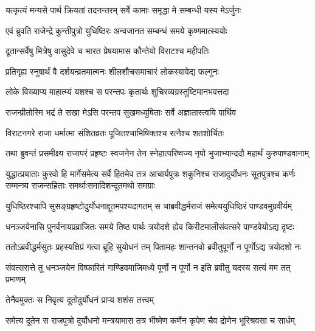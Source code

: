\twolineshloka
{यत्कृत्यं मन्यसे पार्थ क्रियतां तदनन्तरम्}
{सर्वे कामाः समृद्धा मे सम्बन्धी यस्य मेऽर्जुनः}



\twolineshloka
{एवं ब्रुवति राजेन्द्रे कुन्तीपुत्रो युधिष्ठिरः}
{अन्वजानत सम्बन्धं समये कृष्णमात्स्ययोः}


\twolineshloka
{दूतान्सर्वेषु मित्रेषु वासुदेवे च भारत}
{प्रेषयामास कौन्तेयो विराटश्च महीपतिः}



\twolineshloka
{प्रतिगृह्य स्नुषार्थं वै दर्शयन्व्रतमात्मनः}
{शीलशौचसमाचारं लोकस्यावेद्य फल्गुनः}


\twolineshloka
{लोके विख्याप्य माहात्म्यं यशश्च स परन्तपः}
{कृतार्थः शुचिरव्यग्रस्तुष्टिमानभवत्तदा}




\twolineshloka
{राजन्प्रीतोस्मि भद्रं ते सखा मेऽसि परन्तप}
{सुखमध्युषिताः सर्वे अज्ञातास्त्वयि पार्थिव}



\twolineshloka
{विराटनगरे राजा धर्मात्मा संशितव्रतः}
{पूजितश्चाभिषिक्तश्च रत्नैश्च शतशोर्चितः}


\twolineshloka
{तथा ब्रुवन्तं प्रसमीक्ष्य राजापरं प्रहृष्टः स्वजनेन तेन}
{स्नेहात्परिष्वज्य नृपो भुजाभ्यान्ददौ महार्थं कुरुपाण्डवानाम्}


\threelineshloka
{युद्धात्प्रयाताः कुरवो हि मार्गेसमेत्य सर्वे हितमेव तत्र}
{आचार्यपुत्रः शकुनिश्च राजादुर्योधनः सूतपुत्रश्च कर्णः}
{सम्मन्त्र्य राजन्सहिताः समर्थाःसमादिशन्दूतमथो समग्राः}


\twolineshloka
{युधिष्ठिरश्चापि सुसङ्ग्रहृष्टोदुर्योधनाद्दूतमपश्यदागतम्}
{स चाब्रवीद्धर्मराजं समेत्ययुधिष्ठिरं पाण्डवमुग्रवीर्यम्}


\twolineshloka
{धनञ्जयेनासि पुनर्वनायप्रव्राजितः समये तिष्ठ पार्थः}
{त्रयोदशे ह्येव किरीटमालीसंवत्सरे पाण्डवेयोऽद्य दृष्टः}



\twolineshloka
{ततोऽब्रवीद्धर्मसुतः प्रहस्यक्षिप्रं गत्वा ब्रूहि सुयोधनं तम्}
{पितामहः शान्तनवो ब्रवीतुपूर्णो न पूर्णोऽद्य त्रयोदशो नः}


\fourlineindentedshloka
{संवत्सरात्ते तु धनञ्जयेन}
{विष्फारितं गाण्डिवमाजिमध्ये}
{पूर्णो न पूर्णो न इति ब्रवीतु}
{यदस्य सत्यं मम तत् प्रमाणम्}


\onelineshloka
{तेनैवमुक्तः स निवृत्य दूतोदुर्योधनं प्राप्य शशंस तत्त्वम्}

\fourlineindentedshloka
{समेत्य दूतेन स राजपुत्रो}
{दुर्योधनो मन्त्रयामास तत्र}
{भीष्मेण कर्णेन कृपेण चैव}
{द्रोणेन भूरिश्रवसा च सार्धम्}


